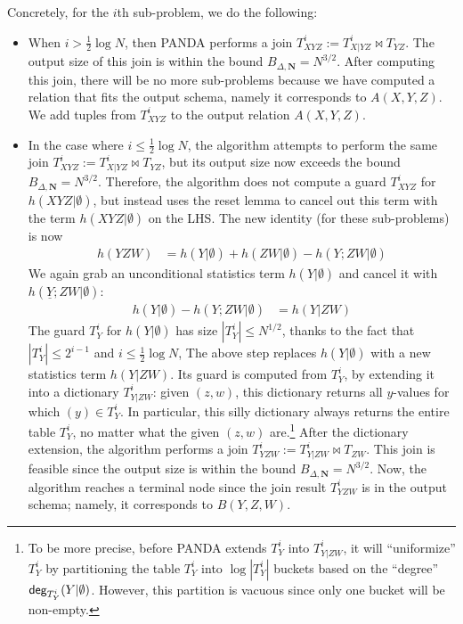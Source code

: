 \documentclass[10pt,a4paper]{article}
\newcommand{\degree}{\text{\sf deg}}
\newcommand{\panda}{\textsf{PANDA}\xspace}
\begin{document}
Concretely, for the $i$th sub-problem, we do the following:
%
\begin{itemize}
\item When $i > \frac 1 2 \log N$, then \panda performs a join
  $T^i_{XYZ} := T^i_{X|YZ} \Join T_{YZ}$.
  The output size of this join is within the bound $B_{\Delta, \bm N} =
  N^{3/2}$. After computing this join, there will be no more sub-problems because
  we have computed a relation that fits the output schema,
  namely it corresponds to $A(X, Y, Z)$.
  We add tuples from $T^i_{XYZ}$ to the output relation $A(X,Y,Z)$.

\item In the case where $i \leq \frac 1 2 \log N$, the algorithm attempts to
  perform the same join $T^i_{XYZ} := T^i_{X|YZ} \Join T_{YZ}$, but its
  output size now exceeds the bound $B_{\Delta, \bm N} = N^{3/2}$.  Therefore, the
  algorithm does not compute a guard $T^i_{XYZ}$ for $h(XYZ|\emptyset)$, but
  instead uses the reset lemma to cancel out this term with the term
  $h(XYZ|\emptyset)$ on the LHS.
  The new identity (for these sub-problems) is now
    \begin{align*}
      h(YZW) &= h(Y|\emptyset) + h(ZW|\emptyset)- h(Y;ZW|\emptyset)
    \end{align*}
  We again grab an unconditional statistics term $h(Y|\emptyset)$
  and cancel it with $h(\underline{Y};ZW|\emptyset)$:
    \begin{align*}
      h(Y|\emptyset)-h(Y;ZW|\emptyset) &= h(Y|ZW)
    \end{align*}
    The guard $T^i_Y$ for $h(Y|\emptyset)$ has size $|T^i_Y| \leq N^{1/2}$,
    thanks to the fact that $|T^i_Y| \leq 2^{i-1}$ and $i \leq \frac{1}{2}\log N$,
  The above step replaces $h(Y|\emptyset)$ with a new statistics term $h(Y|ZW)$.  Its guard is computed from $T^i_Y$, by extending it
  into a dictionary $T^i_{Y|ZW}$: given $(z,w)$, this dictionary returns all $y$-values for which $(y) \in T^i_Y$.
  In particular, this silly dictionary always returns the entire table $T^i_Y$, no matter what the given $(z, w)$ are.\footnote{
    To be more precise, before \panda extends $T^i_Y$ into $T^i_{Y|ZW}$, it will ``uniformize'' $T^i_Y$ by partitioning the table $T^i_Y$ into $\log |T^i_Y|$
  buckets based on the ``degree'' $\degree_{T^i_Y}(Y|\emptyset)$.
  However, this partition is vacuous since only one bucket will be non-empty.}
  After the dictionary extension, the algorithm performs a join
  $T^{i}_{YZW}:=T^i_{Y|ZW}\Join T_{ZW}$.
  This join is feasible since the output size is
  within the bound $B_{\Delta, \bm N} = N^{3/2}$.  Now, the algorithm reaches a
  terminal node since the join result $T^{i}_{YZW}$ is in the output
  schema; namely, it corresponds to $B(Y, Z, W)$.
\end{itemize}
\end{document}
